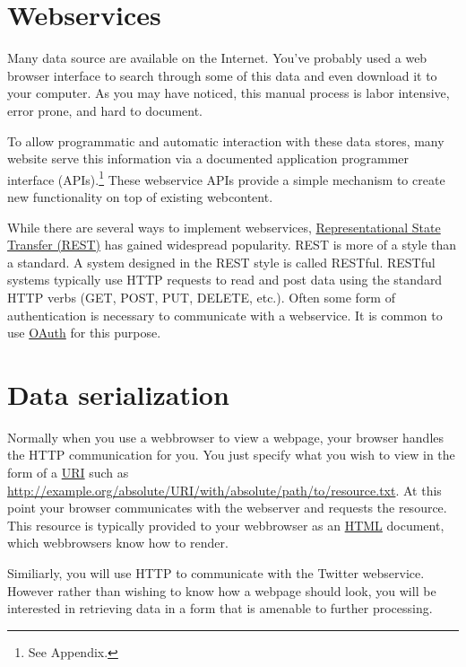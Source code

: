 \section{Webservices}

Many data source are available on the Internet.  You've probably used
a web browser interface to search through some of this data and even
download it to your computer.  As you may have noticed, this manual
process is labor intensive, error prone, and hard to document.

To allow programmatic and automatic interaction with these data stores, many
website serve this information via a documented application programmer
interface (APIs).\footnote{See Appendix.}  These webservice APIs provide a
simple mechanism to create new functionality on top of existing webcontent.

While there are several ways to implement webservices,
\href{http://en.wikipedia.org/wiki/Representational_state_transfer}{Representational
State Transfer (REST)} has gained widespread popularity.  REST is more of a
style than a standard.  A system designed in the REST style is called RESTful.
RESTful systems typically use HTTP requests to read and post data using the
standard HTTP verbs (GET, POST, PUT, DELETE, etc.).  Often some form of
authentication is necessary to communicate with a webservice.  It is common to
use \href{http://en.wikipedia.org/wiki/OAuth}{OAuth} for this purpose.

\section{Data serialization}

Normally when you use a webbrowser to view a webpage, your browser handles
the HTTP communication for you.  You just specify what you wish to view
in the form of a \href{http://en.wikipedia.org/wiki/Uniform_resource_identifier}{URI}
such as \url{http://example.org/absolute/URI/with/absolute/path/to/resource.txt}.
At this point your browser communicates with the webserver and requests the
resource.  This resource is typically provided to your webbrowser as an
\href{http://en.wikipedia.org/wiki/HTML}{HTML} document, which webbrowsers know
how to render.

Similiarly, you will use HTTP to communicate with the Twitter webservice. However
rather than wishing to know how a webpage should look, you will be interested
in retrieving data in a form that is amenable to further processing.

